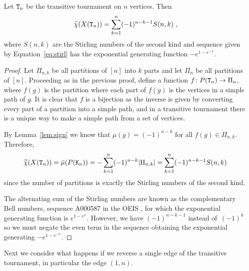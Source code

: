 \documentclass{amsart}
\begin{document}
 \begin{thm}\label{thm:transitive}
 Let ${\tt T}_n$ be the transitive tournament on $n$ vertices. Then  \begin{equation}\label{eq:stirl}\widetilde{\chi}(X(\tT_n))=\sum_{k=1}^{n}(-1)^{n-k-1}S(n,k)\ ,\end{equation}
 where $S(n,k)$ are the Stirling numbers of the second kind and sequence given by Equation~\eqref{eq:stirl} has the exponential generating function $-e^{1-e^{-x}}$.
 \begin{proof}
 Let $\Pi_{n,k}$ be all partitions of $[n]$ into $k$ parts and let $\Pi_n$ be all partitions of $[n]$. Proceeding as in the previous proof, define a function $f\colon P({\tt T}_n)\rightarrow\Pi_n$, where $f(g)$ is the partition where each part of $f(g)$ is the vertices in a simple path of $g$. It is clear that $f$ is a bijection as the inverse is given by converting every part of a partition into a simple path, and in a transitive tournament there is a unique way to make a simple path from a set of vertices.
  
  By Lemma~\ref{lem:sign} we know that $\mu(g)=(-1)^{n-k}$ for all $f(g)\in\Pi_{n,k}$. Therefore,
  $$\widetilde{\chi}(X({\tt T}_n))=\bar{\mu}(P({\tt K}_n))=-\sum_{k=1}^{n}(-1)^{n-k}|\Pi_{n,k}|=\sum_{k=1}^{n}(-1)^{n-k-1}S(n,k)\,$$
  since the number of partitions is exactly the Stirling numbers of the second kind.
  
  The alternating sum of the Stirling numbers are known as the complementary Bell numbers, sequence A000587 in the OEIS \cite{OEIS}, for which the exponential generating function is $e^{1-e^{x}}$. However, we have $(-1)^{n-k-1}$ instead of~$(-1)^k$ so we must negate the even term in the sequence obtaining the exponential generating $-e^{1-e^{-x}}$.
 \end{proof}
 \end{thm}

 
 Next we consider what happens if we reverse a single edge of the transitive tournament, in particular the edge $(1,n)$.
 
\end{document}
